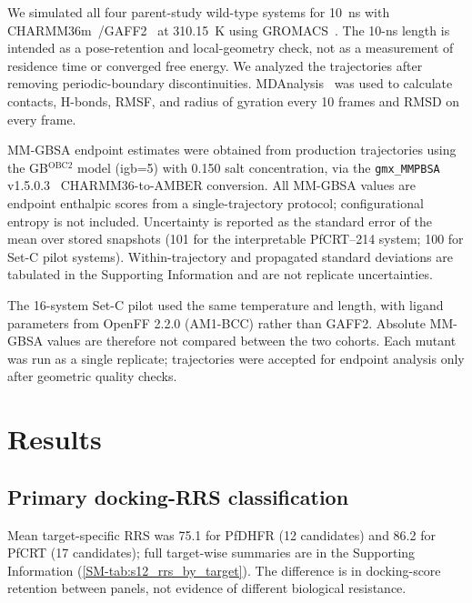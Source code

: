 \documentclass[journal=jcisd8,manuscript=article,layout=traditional]{achemso}
\begin{document}
We simulated all four parent-study wild-type systems for \qty{10}{\nano\second} with CHARMM36m~\citep{charmm36m_2017}/GAFF2~\citep{wang2004gaff} at \qty{310.15}{\kelvin} using GROMACS~\citep{gromacs_2015,lindahl_2024}. The 10-ns length is intended as a pose-retention and local-geometry check, not as a measurement of residence time or converged free energy. We analyzed the trajectories after removing periodic-boundary discontinuities. MDAnalysis~\citep{mdanalysis_2011} was used to calculate contacts, H-bonds, RMSF, and radius of gyration every \num{10} frames and RMSD on every frame.

MM-GBSA endpoint estimates were obtained from production trajectories using the GB$^{\text{OBC2}}$ model (igb=5) with \qty{0.150}{\molar} salt concentration, via the \texttt{gmx\_MMPBSA} v1.5.0.3~\citep{gmx_mmpbsa_2021} CHARMM36-to-AMBER conversion. All MM-GBSA values are endpoint enthalpic scores from a single-trajectory protocol; configurational entropy is not included. Uncertainty is reported as the standard error of the mean over stored snapshots (\num{101} for the interpretable PfCRT--214 system; \num{100} for Set-C pilot systems). Within-trajectory and propagated standard deviations are tabulated in the Supporting Information and are not replicate uncertainties.

The 16-system Set-C pilot used the same temperature and length, with ligand parameters from OpenFF 2.2.0 (AM1-BCC) rather than GAFF2. Absolute MM-GBSA values are therefore not compared between the two cohorts. Each mutant was run as a single replicate; trajectories were accepted for endpoint analysis only after geometric quality checks.


\section{Results}

\subsection{Primary docking-RRS classification}



Mean target-specific RRS was 75.1 for PfDHFR (12 candidates) and 86.2 for PfCRT (17 candidates); full target-wise summaries are in the Supporting Information (\cref{SM-tab:s12_rrs_by_target}). The difference is in docking-score retention between panels, not evidence of different biological resistance.
\end{document}
